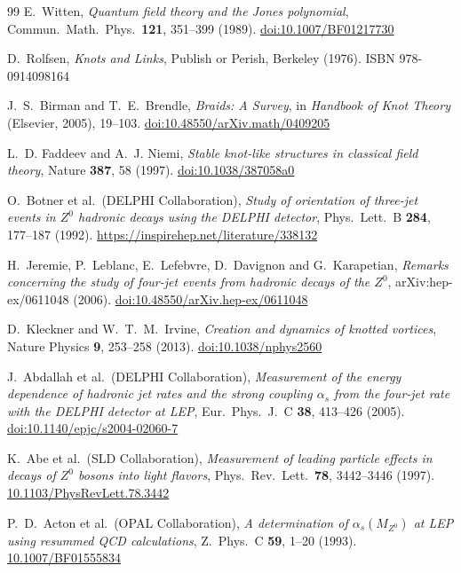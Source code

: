 \documentclass[11pt,a4paper]{article}
\theoremstyle{definition}\newtheorem{definition}[theorem]{Definition}
\theoremstyle{remark}
\begin{document}
\begin{thebibliography}{99}
E.~Witten,
\textit{Quantum field theory and the Jones polynomial},
Commun.\ Math.\ Phys.\ \textbf{121}, 351--399 (1989).
\href{https://doi.org/10.1007/BF01217730}{doi:10.1007/BF01217730}

D.~Rolfsen,
\textit{Knots and Links},
Publish or Perish, Berkeley (1976).
ISBN 978-0914098164

J.~S.~Birman and T.~E.~Brendle,
\textit{Braids: A Survey},
in \textit{Handbook of Knot Theory} (Elsevier, 2005), 19--103.
\href{https://doi.org/10.48550/arXiv.math/0409205}{doi:10.48550/arXiv.math/0409205}

L.~D. Faddeev and A.~J. Niemi,
\textit{Stable knot-like structures in classical field theory},
Nature \textbf{387}, 58 (1997).
\href{https://doi.org/10.1038/387058a0}{doi:10.1038/387058a0}

O.~Botner et al.\ (DELPHI Collaboration),
\textit{Study of orientation of three-jet events in $Z^0$ hadronic
decays using the DELPHI detector},
Phys.\ Lett.\ B \textbf{284}, 177--187 (1992).
\href{https://inspirehep.net/literature/338132}{https://inspirehep.net/literature/338132}

H.~Jeremie, P.~Leblanc, E.~Lefebvre, D.~Davignon and G.~Karapetian,
\textit{Remarks concerning the study of four-jet events from hadronic
decays of the $Z^0$},
arXiv:hep-ex/0611048 (2006).
\href{https://doi.org/10.48550/arXiv.hep-ex/0611048}{doi:10.48550/arXiv.hep-ex/0611048}

D.~Kleckner and W.~T.~M.~Irvine,
\textit{Creation and dynamics of knotted vortices},
Nature Physics \textbf{9}, 253--258 (2013).
\href{https://doi.org/10.1038/nphys2560}{doi:10.1038/nphys2560}

J.~Abdallah et al.\ (DELPHI Collaboration),
\textit{Measurement of the energy dependence of hadronic jet rates and
the strong coupling $\alpha_s$ from the four-jet rate with the DELPHI
detector at LEP},
Eur.\ Phys.\ J.\ C \textbf{38}, 413--426 (2005).
\href{https://doi.org/10.1140/epjc/s2004-02060-7}{doi:10.1140/epjc/s2004-02060-7}

K.~Abe et al.\ (SLD Collaboration),
\textit{Measurement of leading particle effects in decays of $Z^0$
bosons into light flavors},
Phys.\ Rev.\ Lett.\ \textbf{78}, 3442--3446 (1997).
\href{https://doi.org/10.1103/PhysRevLett.78.3442}{10.1103/PhysRevLett.78.3442}

P.~D.~Acton et al.\ (OPAL Collaboration),
\textit{A determination of $\alpha_s(M_{Z^0})$ at LEP using resummed
QCD calculations},
Z.\ Phys.\ C \textbf{59}, 1--20 (1993).
\href{https://doi.org/10.1007/BF01555834}{10.1007/BF01555834}


\end{thebibliography}
\end{document}
